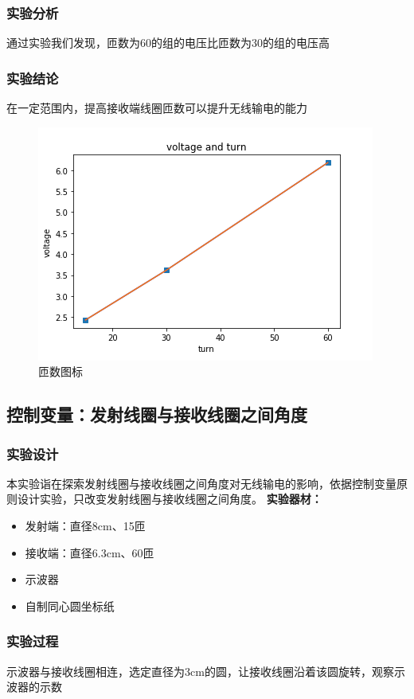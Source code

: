 \documentclass[conference]{IEEEtran}
\theoremstyle{break}
\begin{document}
\subsubsection{实验分析}
通过实验我们发现，匝数为60的组的电压比匝数为30的组的电压高
\subsubsection{实验结论}
在一定范围内，提高接收端线圈匝数可以提升无线输电的能力
\begin{figure}[htbp]
        \centerline{\includegraphics[scale=0.1]{匝数图.png}}
        \caption{匝数图标}
        \label{fig}
        \end{figure}
\subsection{控制变量：发射线圈与接收线圈之间角度}
\subsubsection{实验设计}
本实验诣在探索发射线圈与接收线圈之间角度对无线输电的影响，依据控制变量原则设计实验，只改变发射线圈与接收线圈之间角度。
\textbf{实验器材：}
\begin{itemize}
\item 发射端：直径8cm、15匝
\item 接收端：直径6.3cm、60匝
\item 示波器
\item 自制同心圆坐标纸
\end{itemize}
\subsubsection{实验过程}
示波器与接收线圈相连，选定直径为3cm的圆，让接收线圈沿着该圆旋转，观察示波器的示数
\end{document}
